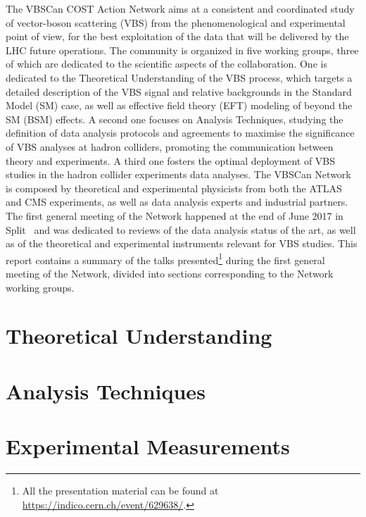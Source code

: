 \documentclass[12pt]{article}
\begin{document}
The VBSCan COST Action Network aims at a consistent and coordinated study of vector-boson scattering (VBS)
from the phenomenological and experimental point of view, 
for the best exploitation of the data that will be delivered by the LHC future operations.
The community is organized in five working groups,
three of which are dedicated to the scientific aspects of the collaboration.
One is dedicated to the Theoretical Understanding of the VBS process,
which targets a detailed description of the VBS signal 
and relative backgrounds in the Standard Model (SM) case, 
as well as effective field theory (EFT) modeling of beyond the SM (BSM) effects.
A second one focuses on Analysis Techniques,
studying the definition of data analysis protocols and agreements 
to maximise the significance of VBS analyses at hadron colliders, 
promoting the communication between theory and experiments.
A third one fosters the optimal deployment of VBS studies 
in the hadron collider experiments data analyses.
\newline{}
The VBSCan Network is composed by theoretical and experimental physicists from both the ATLAS and CMS experiments,
as well as data analysis experts and industrial partners.
The first general meeting of the Network happened at the end of June 2017 in Split~\cite{kickoff}
and was dedicated to reviews of the data analysis status of the art,
as well as of the theoretical and experimental instruments
relevant for VBS studies.
This report contains
a summary of the talks presented\footnote{All the presentation material can be found at \url{https://indico.cern.ch/event/629638/}.} during the first general meeting of the Network,
divided into sections corresponding to the Network working groups.

\section{Theoretical Understanding}



\section{Analysis Techniques}



\section{Experimental Measurements}
\end{document}
